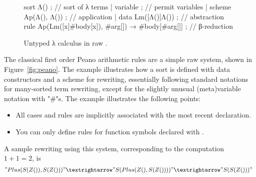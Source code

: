 \documentclass[letterpaper,11pt]{article}
\begin{document}
\begin{figure*}[p]
  \vspace{1em}
  \begin{hacs}[numbers=right,texcl]
    sort Λ() ;                                                      // sort of λ terms
    | variable ;                                                    // permit variables
    | scheme Ap(Λ(), Λ()) ;                                        // application
    | data Lm([Λ()]Λ()) ;                                          // abstraction
    rule Ap(Lm([x]#body[x]), #arg[]) → #body[#arg[]] ;       // β-reduction
  \end{hacs}
  \caption{Untyped λ calculus in raw \HAX.}
  \label{fig:lambda}
\end{figure*}

\begin{example}[Peano]\label{ex:peano}
  The classical first order Peano arithmetic rules are a simple raw \HAX system, shown in
  Figure~\ref{fig:peano}.  The example illustrates how a sort is defined with data constructors and
  a scheme for rewriting, essentially following standard notations for many-sorted term rewriting,
  except for the slightly unusual (meta)variable notation with "#"s. The example illustrates the
  following points:
  \begin{itemize}

  \item All cases and rules are implicitly associated with the most recent 
    declaration.

  \item You can only define rules for function symbols declared with .

  \end{itemize}
  A sample rewriting using this system, corresponding to the computation $1+1=2$, is
  \begin{displaymath}
    "Plus(S(Z()), S(Z()))" →
    "S(Plus(Z(), S(Z())))" →
    "S(S(Z()))"
  \end{displaymath}
\end{example}
\end{document}
